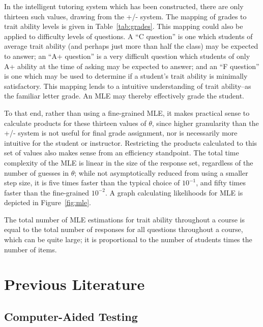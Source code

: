 In the intelligent tutoring system which has been constructed, there are only
thirteen such values, drawing from the +/- system.  The mapping of grades to
trait ability levels is given in Table~\ref{tab:grades}.  This mapping could
also be applied to difficulty levels of questions.  A ``C question'' is one
which students of average trait ability (and perhaps just more than half the
class) may be expected to answer; an ``A+ question'' is a very difficult
question which students of only A+ ability at the time of asking may be
expected to answer; and an ``F question'' is one which may be used to determine
if a student's trait ability is minimally satisfactory.  This mapping lends to
a intuitive understanding of trait ability--as the familiar letter grade.  An
MLE may thereby effectively grade the student.


To that end, rather than using a fine-grained MLE, it makes practical sense to
calculate products for these thirteen values of $\theta$, since higher
granularity than the +/- system is not useful for final grade assignment, nor
is necessarily more intuitive for the student or instructor.  Restricting the
products calculated to this set of values also makes sense from an efficiency
standpoint.  The total time complexity of the MLE is linear in the size of the
response set, regardless of the number of guesses in $\theta$; while not
asymptotically reduced from using a smaller step size, it is five times faster
than the typical choice of $10^{-1}$, and fifty times faster than the
fine-grained $10^{-2}$.  A graph calculating likelihoods for MLE is depicted in
Figure~\ref{fig:mle}.


The total number of MLE estimations for trait ability throughout a course is
equal to the total number of responses for all questions throughout a course,
which can be quite large; it is proportional to the number of students times
the number of items. 


\section{Previous Literature}
\label{sec:litreview}

\subsection{Computer-Aided Testing}

